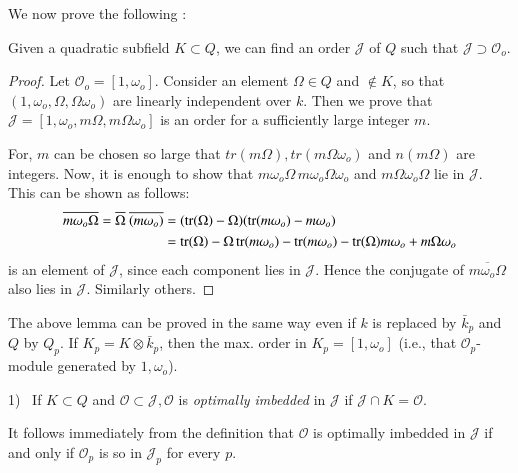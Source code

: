 We now prove the following : 
\setcounter{lemma}{0}
\begin{lemma}\label{chap4:sec9:lem1}%
  Given a quadratic subfield $K \subset Q$, we can find an order
  $\mathcal{J}$ of $Q$ such that $\mathcal{J} \supset \mathscr{O}_o$. 
\end{lemma}

\begin{proof}
  Let $\mathscr{O}_o = [1, \omega_o]$. Consider an element $\Omega \in
  Q$ and $\not\in K$, so that $(1, \omega_o, \Omega, \Omega \omega_o)$
  are linearly independent over $k$. Then we prove that $\mathcal{J} =
  [1, \omega_o, m \Omega, m \Omega \omega_o]$ is an order for a
  sufficiently large integer $m$. 

  For, $m$ can be chosen so large that $tr (m \Omega), tr (m \Omega
  \omega_o)$ and $n(m \Omega)$ are integers. Now, it is enough to show
  that $m \omega_o \Omega\, m \omega_o \Omega \omega_o$ and $m \Omega
  \omega_o \Omega$ lie in $\mathcal{J}$. This can be shown as follows: 
  \begin{align*}
    \overline {m \omega_o \Omega} = \overline{\Omega} ~\overline{(m
      \omega_o)} & = (\operatorname{tr} (\Omega) - \Omega) (\operatorname{tr} (m \omega_o) - m
    \omega_o)\\ 
    & = \operatorname{tr} (\Omega)- \Omega \operatorname{tr} (m \omega_o) - \operatorname{tr} (m \omega_o) - \operatorname{tr}
    (\Omega) m \omega_o + m \Omega \omega_o 
  \end{align*} 
  is an element of $\mathcal{J}$, since each component lies in
  $\mathcal{J}$. Hence the conjugate of $\overline{m \omega_o \Omega}$
  also lies in $\mathcal{J}$. Similarly others. 
\end{proof}

\begin{note}%
  The above lemma can be proved in the same way even if $k$ is
  replaced by $\bar{k}_p$ and $Q$ by $Q_p$. If $K_p = K \otimes
  \bar{k}_p$, then the max. order in $K_p = [1, \omega_o]$ (i.e., that
  $\mathscr{O}_p$-module generated by $1, \omega_o$). 
\end{note}

\begin{defi*}%
  1)~ If $K \subset Q$ and $\mathscr{O} \subset \mathcal{J},
  \mathscr{O}$ is {\em optimally imbedded } in $\mathcal{J}$ if
  $\mathcal{J} \cap K = \mathscr{O}$. 
\end{defi*}

It follows immediately from the definition that $\mathscr{O}$ is
optimally imbedded in $\mathcal{J}$ if and only if $\mathscr{O}_p$ is
so in $\mathcal{J}_p$ for every $p$. 

